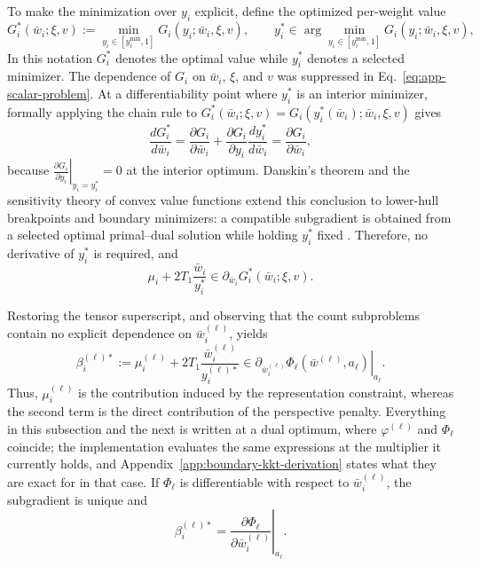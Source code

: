 \documentclass{article}
\begin{document}
To make the minimization over $y_i$ explicit, define the optimized per-weight
value
\[
  G_i^*(\bar w_i;\xi,v)
  :=
  \min_{y_i\in[y_i^{\min},1]}
  G_i(y_i;\bar w_i,\xi,v),
  \qquad
  y_i^*\in\arg\min_{y_i\in[y_i^{\min},1]}
  G_i(y_i;\bar w_i,\xi,v),
\]
In this notation $G_i^*$ denotes the optimal value while $y_i^*$ denotes a
selected minimizer.
The dependence of $G_i$ on $\bar w_i$, $\xi$, and $v$ was suppressed in
Eq.~\eqref{eq:app-scalar-problem}. At a differentiability point where $y_i^*$ is
an interior minimizer, formally applying the chain rule to
$G_i^*(\bar w_i;\xi,v)=G_i(y_i^*(\bar w_i);\bar w_i,\xi,v)$ gives
\[
  \frac{dG_i^*}{d\bar w_i}
  =
  \frac{\partial G_i}{\partial\bar w_i}
  +
  \frac{\partial G_i}{\partial y_i}
  \frac{dy_i^*}{d\bar w_i}
  =
  \frac{\partial G_i}{\partial\bar w_i},
\]
because $\left.\frac{\partial G_i}{\partial y_i}\right|_{y_i=y_i^*}=0$
at the interior optimum. Danskin's
theorem and the sensitivity theory of convex value functions extend this
conclusion to lower-hull breakpoints and boundary minimizers: a compatible
subgradient is obtained from a selected optimal primal--dual solution while
holding $y_i^*$ fixed \citep{danskin1966maxmin,bonnans2000perturbation}.
Therefore, no derivative of $y_i^*$ is required, and
\[
  \mu_i+2T_1\frac{\bar w_i}{y_i^*}
  \in
  \partial_{\bar w_i}G_i^*(\bar w_i;\xi,v).
\]

Restoring the tensor superscript, and observing that the count subproblems
contain no explicit dependence on $\bar w_i^{(\ell)}$, yields
\begin{equation}
  \beta_i^{(\ell)*}
  :=
  \mu_i^{(\ell)}
  +2T_1
   \frac{\bar w_i^{(\ell)}}{y_i^{(\ell)*}}
  \in
  \left.
  \partial_{\bar w_i^{(\ell)}}
  \Phi_\ell\!\left(\bar w^{(\ell)},a_\ell\right)
  \right|_{a_\ell}.
  \label{eq:app-weight-envelope}
\end{equation}
Thus, $\mu_i^{(\ell)}$ is the contribution induced by the representation
constraint, whereas the second term is the direct contribution of the perspective
penalty. Everything in this subsection and the next is written at a dual optimum,
where $\varphi^{(\ell)}$ and $\Phi_\ell$ coincide; the implementation evaluates the
same expressions at the multiplier it currently holds, and
Appendix~\ref{app:boundary-kkt-derivation} states what they are exact for in that
case. If $\Phi_\ell$ is differentiable with respect to $\bar w_i^{(\ell)}$, the
subgradient is unique and
\[
  \beta_i^{(\ell)*}
  =
  \left.
  \frac{\partial\Phi_\ell}
       {\partial\bar w_i^{(\ell)}}
  \right|_{a_\ell}.
\]
\end{document}
